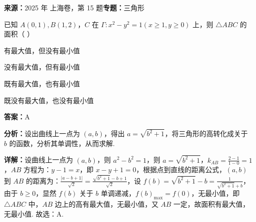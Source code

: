 \begin{question}[points=5]
\textbf{来源：}2025 年 上海卷，第 15 题\quad \textbf{专题：}三角形\par
已知 $A(0,1), B(1,2)$，$C$ 在 $\Gamma: x^2 - y^2 = 1 (x \geq 1, y \geq 0)$ 上，则 $\triangle ABC$ 的面积（ ）
\begin{choices}
  \item 有最大值，但没有最小值
  \item 没有最大值，但有最小值
  \item 既有最大值，也有最小值
  \item 既没有最大值，也没有最小值
\end{choices}
\begin{solution}
\textbf{答案：}A

\textbf{分析：}设出曲线上一点为 $(a, b)$，得出 $a = \sqrt{b^2 + 1}$，将三角形的高转化成关于 $b$ 的函数，分析其单调性，从而求解.

\textbf{详解：}设曲线上一点为 $(a, b)$，则 $a^2 - b^2 = 1$，则 $a = \sqrt{b^2 + 1}$，$k_{AB} = \frac{2-1}{1-0} = 1$，$AB$ 方程为：$y-1 = x$，即 $x - y + 1 = 0$，根据点到直线的距离公式，$(a, b)$ 到 $AB$ 的距离为：$\frac{|a - b + 1|}{\sqrt{2}} = \frac{\sqrt{b^2 + 1} - b + 1}{\sqrt{2}}$，设 $f(b) = \sqrt{b^2 + 1} - b = \frac{1}{\sqrt{b^2 + 1} + b}$，由于 $b \geq 0$，显然 $f(b)$ 关于 $b$ 单调递减，$f(b)_{\max} = f(0)$，无最小值，即 $\triangle ABC$ 中，$AB$ 边上的高有最大值，无最小值，又 $AB$ 一定，故面积有最大值，无最小值. 故选：A.
\end{solution}
\end{question}

